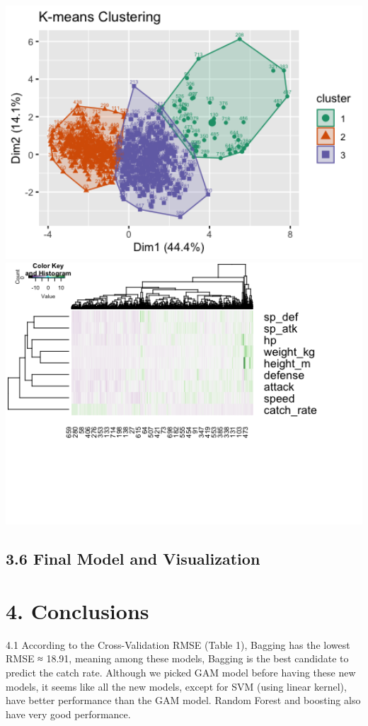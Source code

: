 \documentclass[
]{article}
\begin{document}
\includegraphics[width=6.25in]{./plot/k-mean-cluster-plot}
\includegraphics[width=7.22in]{./plot/hc-heatmap}

\hypertarget{final-model-and-visualization}{%
\subsection{3.6 Final Model and
Visualization}\label{final-model-and-visualization}}

\hypertarget{conclusions}{%
\section{4. Conclusions}\label{conclusions}}

4.1 According to the Cross-Validation RMSE (Table 1), Bagging has the
lowest RMSE ≈ 18.91, meaning among these models, Bagging is the best
candidate to predict the catch rate. Although we picked GAM model before
having these new models, it seems like all the new models, except for
SVM (using linear kernel), have better performance than the GAM model.
Random Forest and boosting also have very good performance.
\end{document}
